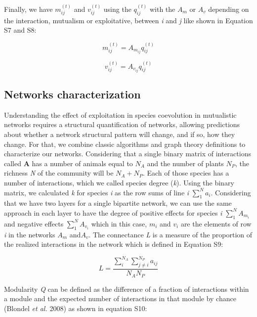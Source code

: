 \documentclass[a4paper, 12pt]{article}
\begin{document}
Finally, we have $m^{(t)}_{ij}$ and $v^{(t)}_{ij}$ using the $q^{(t)}_{ij}$ with the $A_{m}$ or $A_{v}$ depending on the interaction, mutualism or exploitative, between \textit{i} and \textit{j} like shown in Equation S7 and S8:

\begin{equation} \label{supeq:7}
  m^{(t)}_{ij} = A_{m_{ij}}q^{(t)}_{ij}
\end{equation}

\begin{equation} \label{supeq:8}
  v^{(t)}_{ij} = A_{v_{ij}}q^{(t)}_{ij}
\end{equation}

\subsection*{Networks characterization}
Understanding the effect of exploitation in species coevolution in mutualistic networks requires a structural quantification of networks, allowing predictions about whether a network structural pattern will change, and if so, how they change. For that, we combine classic algorithms and graph theory definitions to characterize our networks. Considering that a single binary matrix of interactions called \textbf{A} has a number of animals equal to $N_{A}$ and the number of plants $N_{P}$, the richness \textit{N} of the community will be $N_{A}+N_{P}$. Each of those species has a number of interactions, which we called species degree (\textit{k}). Using the binary matrix, we calculated \textit{k} for species \textit{i} as the row sums of line \textit{i} $\sum_{1}^{N}a_{i}$. Considering that we have two layers for a single bipartite network, we can use the same approach in each layer to have the degree of positive effects for species \textit{i} $\sum_{1}^{N}A_{m_{i}}$ and negative effects $\sum_{1}^{N}A_{v_{i}}$ which in this case, $m_{i}$ and $v_{i}$ are the elements of row \textit{i} in the networks $A_{m}$ and$A_{v}$. The connectance \textit{L}  is a measure of the proportion of the realized interactions in the network which is defined in Equation S9:

\begin{equation} \label{supeq:9}
  L = \frac{\sum_{i}^{N_{A}}\sum_{j \neq i}^{N_{P}}a_{ij}}{N_{A}N_{P}}
\end{equation}

Modularity \textit{Q} can be defined as the difference of a fraction of interactions within a module and the expected number of interactions in that module by chance (Blondel \textit{et al.} 2008) as shown in equation S10: 
\end{document}
